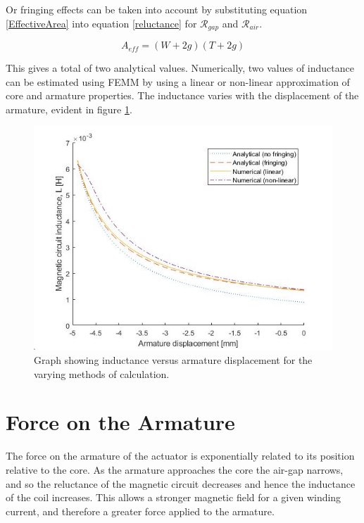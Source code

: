 \documentclass[a4paper]{IEEEtran}
\begin{document}
    Or fringing effects can be taken into account by substituting equation \ref{EffectiveArea} into equation \ref{reluctance} for $\mathcal{R}_{gap}$ and $\mathcal{R}_{air}$. 

    \begin{equation}
        A_{eff} = (W + 2g)(T + 2g)
        \label{EffectiveArea}
    \end{equation}

    This gives a total of two analytical values. Numerically, two values of inductance can be estimated using FEMM by using a linear or non-linear approximation of core and armature properties. The inductance varies with the displacement of the armature, evident in figure \ref{inductanceGraph}.

    \begin{figure}[ht]
        \includegraphics[width = \linewidth]{Inductances.jpg}
        \caption{Graph showing inductance versus armature displacement for the varying methods of calculation.}
        \label{inductanceGraph} 
    \end{figure}


\section{Force on the Armature}

    The force on the armature of the actuator is exponentially related to its position relative to the core. As the armature approaches the core the air-gap narrows, and so the reluctance of the magnetic circuit decreases and hence the inductance of the coil increases. This allows a stronger magnetic field for a given winding current, and therefore a greater force applied to the armature.
\end{document}
